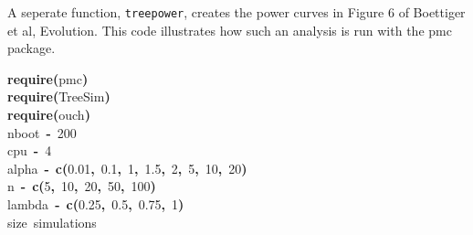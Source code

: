 \documentclass{elsarticle}
\makeatletter
\newcommand{\hlnumber}[1]{\textcolor[rgb]{0,0,0}{#1}}%
\newcommand{\hlfunctioncall}[1]{\textcolor[rgb]{.5,0,.33}{\textbf{#1}}}%
\newcommand{\hlkeyword}[1]{\textbf{#1}}%
\newcommand{\hlcomment}[1]{\textcolor[rgb]{.18,.6,.34}{#1}}%
\newcommand{\hlassignement}[1]{\textbf{#1}}%
\newcommand{\hlsymbol}[1]{#1}%
\newcommand{\hlstd}[1]{\textcolor[rgb]{0,0,0}{#1}}%
\newenvironment{kframe}{%
 \def\FrameCommand##1{\hskip\@totalleftmargin \hskip-\fboxsep
 \colorbox{shadecolor}{##1}\hskip-\fboxsep
     \hskip-\linewidth \hskip-\@totalleftmargin \hskip\columnwidth}%
 \MakeFramed {\advance\hsize-\width
   \@totalleftmargin\z@ \linewidth\hsize
   \@setminipage}}%
 {\par\unskip\endMakeFramed}
\newenvironment{knitrout}{}{} %
\makeatother
\begin{document}
A seperate function, \texttt{treepower}, creates the power curves in Figure 6 of Boettiger et al, Evolution. This code illustrates how such an analysis is run with the pmc package.   
\begin{knitrout}
\color{fgcolor}\begin{kframe}
\begin{flushleft}
\ttfamily\noindent
\hlfunctioncall{require}\hlkeyword{(}\hlsymbol{pmc}\hlkeyword{)}\hspace*{\fill}\\
\hlstd{}\hlfunctioncall{require}\hlkeyword{(}\hlsymbol{TreeSim}\hlkeyword{)}\hspace*{\fill}\\
\hlstd{}\hlfunctioncall{require}\hlkeyword{(}\hlsymbol{ouch}\hlkeyword{)}\hspace*{\fill}\\
\hlstd{}\hlsymbol{nboot}{\ }\hlassignement{\usebox{\hlnormalsizeboxlessthan}-}{\ }\hlnumber{200}\hspace*{\fill}\\
\hlstd{}\hlsymbol{cpu}{\ }\hlassignement{\usebox{\hlnormalsizeboxlessthan}-}{\ }\hlnumber{4}\hspace*{\fill}\\
\hlstd{}\hlsymbol{alpha}{\ }\hlassignement{\usebox{\hlnormalsizeboxlessthan}-}{\ }\hlfunctioncall{c}\hlkeyword{(}\hlnumber{0.01}\hlkeyword{,}{\ }\hlnumber{0.1}\hlkeyword{,}{\ }\hlnumber{1}\hlkeyword{,}{\ }\hlnumber{1.5}\hlkeyword{,}{\ }\hlnumber{2}\hlkeyword{,}{\ }\hlnumber{5}\hlkeyword{,}{\ }\hlnumber{10}\hlkeyword{,}{\ }\hlnumber{20}\hlkeyword{)}\hspace*{\fill}\\
\hlstd{}\hlsymbol{n}{\ }\hlassignement{\usebox{\hlnormalsizeboxlessthan}-}{\ }\hlfunctioncall{c}\hlkeyword{(}\hlnumber{5}\hlkeyword{,}{\ }\hlnumber{10}\hlkeyword{,}{\ }\hlnumber{20}\hlkeyword{,}{\ }\hlnumber{50}\hlkeyword{,}{\ }\hlnumber{100}\hlkeyword{)}\hspace*{\fill}\\
\hlstd{}\hlsymbol{lambda}{\ }\hlassignement{\usebox{\hlnormalsizeboxlessthan}-}{\ }\hlfunctioncall{c}\hlkeyword{(}\hlnumber{0.25}\hlkeyword{,}{\ }\hlnumber{0.5}\hlkeyword{,}{\ }\hlnumber{0.75}\hlkeyword{,}{\ }\hlnumber{1}\hlkeyword{)}\hspace*{\fill}\\
\hlstd{}\hlcomment{\usebox{\hlnormalsizeboxhash}{\ }size{\ }simulations}\hspace*{\fill}\\

\end{flushleft}
\end{kframe}
\end{knitrout}
\end{document}
